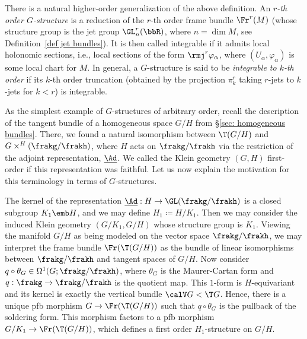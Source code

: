 \begin{rem}
    There is a natural higher-order generalization of the above definition. An \emph{$r$-th order $G$-structure} is a reduction of the $r$-th order frame bundle $\Fr^r(M)$ (whose structure group is the jet group $\GL^r_n(\bbR)$, where $n=\dim M$, see Definition~\ref{def jet bundles}). It is then called integrable if it admits local holonomic sections, i.e., local sections of the form $\rmj^r \varphi_\alpha$, where $(U_\alpha,\varphi_\alpha)$ is some local chart for $M$. In general, a $G$-structure is said to be \emph{integrable to $k$-th order} if its $k$-th order truncation (obtained by the projection $\pi^r_k$ taking $r$-jets to $k$-jets for $k<r$) is integrable.
\end{rem}

\begin{rem}\label{rem higher order Klein geometry}
    As the simplest example of $G$-structures of arbitrary order, recall the description of the tangent bundle of a homogeneous space $G\slash H$ from \S\ref{sec: homogeneous bundles}. There, we found a natural isomorphism between $\T(G\slash H)$ and $G\times^H (\frakg\slash\frakh)$, where $H$ acts on $\frakg\slash\frakh$ via the restriction of the adjoint representation,  $\underline{\Ad}$. We called the Klein geometry $(G,H)$ first-order if this representation was faithful. Let us now explain the motivation for this terminology in terms of $G$-structures.

    The kernel of the representation $\underline{\Ad}:H\to \GL(\frakg\slash\frakh)$ is a closed subgroup $K_1\emb H$, and we may define $H_1\coloneqq H\slash K_1$. Then we may consider the induced Klein geometry $(G\slash K_1,G\slash H)$ whose structure group is $K_1$. Viewing the manifold $G\slash H$ as being modeled on the vector space $\frakg\slash\frakh$, we may interpret the frame bundle $\Fr(\T(G\slash H))$ as the bundle of linear isomorphisms between $\frakg\slash\frakh$ and tangent spaces of $G\slash H$. Now consider $q\circ \theta_G\in \Omega^1(G;\frakg\slash\frakh)$, where $\theta_G$ is the Maurer-Cartan form and $q:\frakg\to\frakg\slash\frakh$ is the quotient map. This $1$-form is $H$-equivariant and its kernel is exactly the vertical bundle $\calV G<\T G$. Hence, there is a unique \gls{pfb} morphism $G\to \Fr(\T(G\slash H))$ such that $q\circ \theta_G$ is the pullback of the soldering form. This morphism factors to a \gls{pfb} morphism $G\slash K_1\to \Fr(\T(G\slash H))$, which defines a first order $H_1$-structure on $G\slash H$.


\end{rem}
